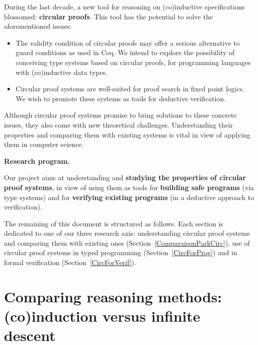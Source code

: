 \documentclass{article}
\begin{document}
During the last decade, a new tool for reasoning on (co)inductive specifications blossomed: \textbf{circular proofs}. This tool has the potential to solve the aforementioned issues:



\begin{itemize}
\item 
The validity condition of circular proofs may offer a serious alternative to guard conditions as used in Coq. We intend to explore the possibility of conceiving type systems based on circular proofs, for programming languages with (co)inductive data types.
  
\item 
Circular proof systems are well-suited for proof search in fixed point logics. We wish to promote these systems as tools for deductive verification.
\end{itemize}

Although circular proof systems promise to bring solutions to these concrete issues, they also come with new theoretical challenges. Understanding their properties and comparing them with existing systems is vital in view of applying them in computer science.


\medskip
\begin{center}
\begin{bclogo}[logo= ,arrondi = 0.1, couleur = green!10,  epBarre = 0]{}
  \vspace{-10pt}
  \textbf{Research program.}
  
  
Our project aims at understanding and \textbf{studying the properties of circular proof systems}, in view of using them as tools for \textbf{building safe programs} (via type systems) and for \textbf{verifying existing programs} (in a deductive approach to verification).
 
\end{bclogo}
\end{center}

The remaining of this document is structured as follows.
Each section is dedicated to one of our three research axis: understanding circular proof systems and comparing them with existing ones (Section~\ref{ComparaisonParkCirc}), use of circular proof systems in typed programming (Section~\ref{CircForProg}) and in formal verification (Section~\ref{CircForVerif}).


\section{Comparing reasoning methods: (co)induction versus infinite descent}
\end{document}
